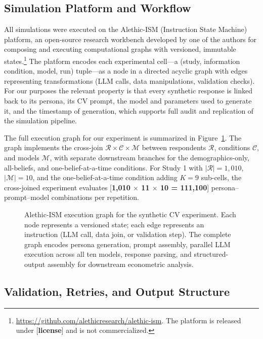 \documentclass[12pt]{article}
\begin{document}
\subsection{Simulation Platform and Workflow}\label{sec:methods-platform}

All simulations were executed on the Alethic-ISM (Instruction State Machine) platform, an open-source research workbench developed by one of the authors for composing and executing computational graphs with versioned, immutable states.\footnote{\url{https://github.com/alethicresearch/alethic-ism}. The platform is released under [\textbf{license}] and is not commercialized.}
The platform encodes each experimental cell---a (study, information
condition, model, run) tuple---as a node in a directed acyclic graph with
edges representing transformations (LLM calls, data manipulations,
validation checks). For our purposes the relevant property is that every
synthetic response is linked back to its persona, its CV prompt, the
model and parameters used to generate it, and the timestamp of generation,
which supports full audit and replication of the simulation pipeline.

The full execution graph for our experiment is summarized in
Figure~\ref{fig:graph}. The graph implements the cross-join $\mathcal{R}
\times \mathcal{C} \times \mathcal{M}$ between respondents $\mathcal{R}$,
conditions $\mathcal{C}$, and models $\mathcal{M}$, with separate
downstream branches for the demographics-only, all-beliefs, and
one-belief-at-a-time conditions. For Study 1 with $|\mathcal{R}| = 1{,}010$,
$|\mathcal{M}| = 10$, and the one-belief-at-a-time condition adding $K = 9$
sub-cells, the cross-joined experiment evaluates [\textbf{1{,}010 $\times$
11 $\times$ 10 = 111{,}100}] persona--prompt--model combinations per
repetition.

\begin{figure}[h]
    \centering
    \caption{Alethic-ISM execution graph for the synthetic CV experiment.
    Each node represents a versioned state; each edge represents an
    instruction (LLM call, data join, or validation step). The complete
    graph encodes persona generation, prompt assembly, parallel LLM
    execution across all ten models, response parsing, and
    structured-output assembly for downstream econometric analysis.}
    \label{fig:graph}
\end{figure}

\subsection{Validation, Retries, and Output Structure}\label{sec:methods-validation}
\end{document}

